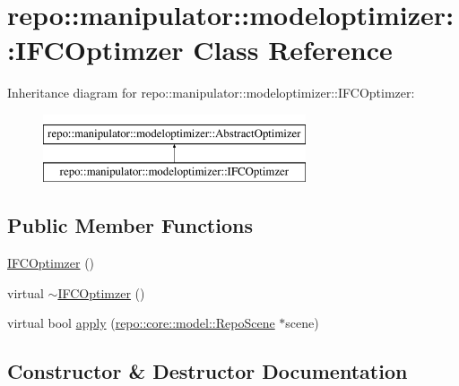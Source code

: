 \hypertarget{classrepo_1_1manipulator_1_1modeloptimizer_1_1_i_f_c_optimzer}{}\section{repo\+:\+:manipulator\+:\+:modeloptimizer\+:\+:I\+F\+C\+Optimzer Class Reference}
\label{classrepo_1_1manipulator_1_1modeloptimizer_1_1_i_f_c_optimzer}
Inheritance diagram for repo\+:\+:manipulator\+:\+:modeloptimizer\+:\+:I\+F\+C\+Optimzer\+:\begin{figure}[H]
\begin{center}
\leavevmode
\includegraphics[height=2.000000cm]{classrepo_1_1manipulator_1_1modeloptimizer_1_1_i_f_c_optimzer}
\end{center}
\end{figure}
\subsection*{Public Member Functions}
\begin{DoxyCompactItemize}
\item 
\hyperlink{classrepo_1_1manipulator_1_1modeloptimizer_1_1_i_f_c_optimzer_a8ee34a88f9103142aa677279264773e8}{I\+F\+C\+Optimzer} ()
\item 
virtual \hyperlink{classrepo_1_1manipulator_1_1modeloptimizer_1_1_i_f_c_optimzer_ad12a91fe9357bda07592df46b549671a}{$\sim$\+I\+F\+C\+Optimzer} ()
\item 
virtual bool \hyperlink{classrepo_1_1manipulator_1_1modeloptimizer_1_1_i_f_c_optimzer_a5ea4e1e6cd502d72a3ba3cca593eb9d3}{apply} (\hyperlink{classrepo_1_1core_1_1model_1_1_repo_scene}{repo\+::core\+::model\+::\+Repo\+Scene} $\ast$scene)
\end{DoxyCompactItemize}


\subsection{Constructor \& Destructor Documentation}
\hypertarget{classrepo_1_1manipulator_1_1modeloptimizer_1_1_i_f_c_optimzer_a8ee34a88f9103142aa677279264773e8}{}
